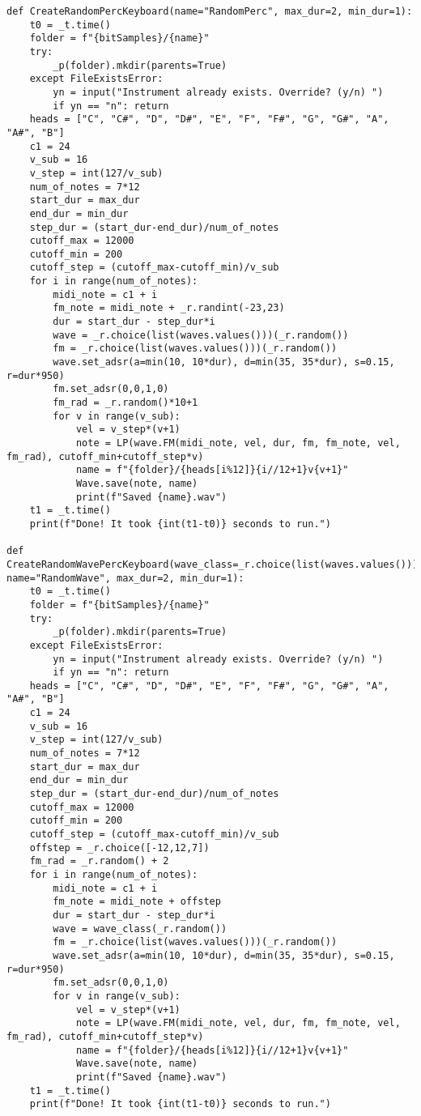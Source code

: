 \documentclass[../main.tex]{subfiles}
\begin{document}
\begin{verbatim}
def CreateRandomPercKeyboard(name="RandomPerc", max_dur=2, min_dur=1):
    t0 = _t.time()
    folder = f"{bitSamples}/{name}"
    try:
        _p(folder).mkdir(parents=True)
    except FileExistsError:
        yn = input("Instrument already exists. Override? (y/n) ")
        if yn == "n": return
    heads = ["C", "C#", "D", "D#", "E", "F", "F#", "G", "G#", "A", "A#", "B"]
    c1 = 24
    v_sub = 16
    v_step = int(127/v_sub)
    num_of_notes = 7*12
    start_dur = max_dur
    end_dur = min_dur
    step_dur = (start_dur-end_dur)/num_of_notes
    cutoff_max = 12000
    cutoff_min = 200
    cutoff_step = (cutoff_max-cutoff_min)/v_sub
    for i in range(num_of_notes):
        midi_note = c1 + i
        fm_note = midi_note + _r.randint(-23,23)
        dur = start_dur - step_dur*i
        wave = _r.choice(list(waves.values()))(_r.random())
        fm = _r.choice(list(waves.values()))(_r.random())
        wave.set_adsr(a=min(10, 10*dur), d=min(35, 35*dur), s=0.15, r=dur*950)
        fm.set_adsr(0,0,1,0)
        fm_rad = _r.random()*10+1
        for v in range(v_sub):
            vel = v_step*(v+1)
            note = LP(wave.FM(midi_note, vel, dur, fm, fm_note, vel, fm_rad), cutoff_min+cutoff_step*v)
            name = f"{folder}/{heads[i%12]}{i//12+1}v{v+1}"
            Wave.save(note, name)
            print(f"Saved {name}.wav")
    t1 = _t.time()
    print(f"Done! It took {int(t1-t0)} seconds to run.")

def CreateRandomWavePercKeyboard(wave_class=_r.choice(list(waves.values())), name="RandomWave", max_dur=2, min_dur=1):
    t0 = _t.time()
    folder = f"{bitSamples}/{name}"
    try:
        _p(folder).mkdir(parents=True)
    except FileExistsError:
        yn = input("Instrument already exists. Override? (y/n) ")
        if yn == "n": return
    heads = ["C", "C#", "D", "D#", "E", "F", "F#", "G", "G#", "A", "A#", "B"]
    c1 = 24
    v_sub = 16
    v_step = int(127/v_sub)
    num_of_notes = 7*12
    start_dur = max_dur
    end_dur = min_dur
    step_dur = (start_dur-end_dur)/num_of_notes
    cutoff_max = 12000
    cutoff_min = 200
    cutoff_step = (cutoff_max-cutoff_min)/v_sub
    offstep = _r.choice([-12,12,7])
    fm_rad = _r.random() + 2
    for i in range(num_of_notes):
        midi_note = c1 + i
        fm_note = midi_note + offstep
        dur = start_dur - step_dur*i
        wave = wave_class(_r.random())
        fm = _r.choice(list(waves.values()))(_r.random())
        wave.set_adsr(a=min(10, 10*dur), d=min(35, 35*dur), s=0.15, r=dur*950)
        fm.set_adsr(0,0,1,0)
        for v in range(v_sub):
            vel = v_step*(v+1)
            note = LP(wave.FM(midi_note, vel, dur, fm, fm_note, vel, fm_rad), cutoff_min+cutoff_step*v)
            name = f"{folder}/{heads[i%12]}{i//12+1}v{v+1}"
            Wave.save(note, name)
            print(f"Saved {name}.wav")
    t1 = _t.time()
    print(f"Done! It took {int(t1-t0)} seconds to run.")


\end{verbatim}
\end{document}
